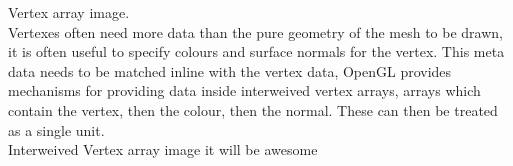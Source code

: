 Vertex array image.\\

Vertexes often need more data than the pure geometry of the mesh to be drawn, it
is often useful to specify colours and surface normals for the vertex. This meta
data needs to be matched inline with the vertex data, OpenGL provides mechanisms
for providing data inside interweived vertex arrays, arrays which contain the 
vertex, then the colour, then the normal. These can then be treated as a single
unit.\\

Interweived Vertex array image it will be awesome\\
